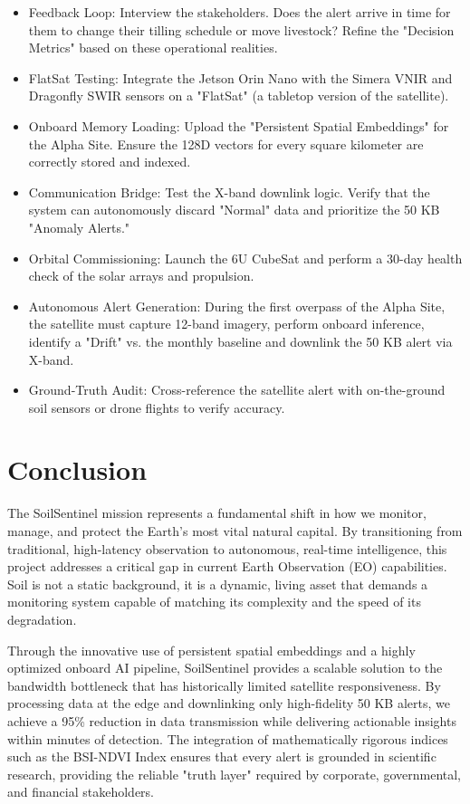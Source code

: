 \documentclass[11pt,letterpaper]{article}
\theoremstyle{plain}
\theoremstyle{definition}
\theoremstyle{remark}
\begin{document}
\begin{itemize}
    \item Feedback Loop: Interview the stakeholders. Does the alert arrive in time for them to change their tilling schedule or move livestock? Refine the "Decision Metrics" based on these operational realities.
    \item FlatSat Testing: Integrate the Jetson Orin Nano with the Simera VNIR and Dragonfly SWIR sensors on a "FlatSat" (a tabletop version of the satellite).
    \item Onboard Memory Loading: Upload the "Persistent Spatial Embeddings" for the Alpha Site. Ensure the 128D vectors for every square kilometer are correctly stored and indexed.
    \item Communication Bridge: Test the X-band downlink logic. Verify that the system can autonomously discard "Normal" data and prioritize the 50 KB "Anomaly Alerts."
    \item Orbital Commissioning: Launch the 6U CubeSat and perform a 30-day health check of the solar arrays and propulsion.
    \item Autonomous Alert Generation: During the first overpass of the Alpha Site, the satellite must capture 12-band imagery, perform onboard inference, identify a "Drift" vs. the monthly baseline and downlink the 50 KB alert via X-band.
    \item Ground-Truth Audit: Cross-reference the satellite alert with on-the-ground soil sensors or drone flights to verify accuracy.
\end{itemize}

 
\section{Conclusion}

The SoilSentinel mission represents a fundamental shift in how we monitor, manage, and protect the Earth’s most vital natural capital. By transitioning from traditional, high-latency observation to autonomous, real-time intelligence, this project addresses a critical gap in current Earth Observation (EO) capabilities. Soil is not a static background, it is a dynamic, living asset that demands a monitoring system capable of matching its complexity and the speed of its degradation. 

Through the innovative use of persistent spatial embeddings and a highly optimized onboard AI pipeline, SoilSentinel provides a scalable solution to the bandwidth bottleneck that has historically limited satellite responsiveness. By processing data at the edge and downlinking only high-fidelity 50 KB alerts, we achieve a 95\% reduction in data transmission while delivering actionable insights within minutes of detection. The integration of mathematically rigorous indices such as the BSI-NDVI Index ensures that every alert is grounded in scientific research, providing the reliable "truth layer" required by corporate, governmental, and financial stakeholders.
\end{document}
